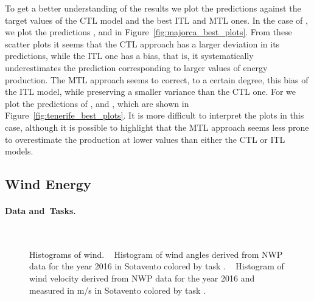 %
To get a better understanding of the results we plot the predictions against the target values of the CTL model and the best ITL and MTL ones.
%
In the case of , we plot the predictions ,  and  in Figure~\ref{fig:majorca_best_plots}.
From these scatter plots it seems that the CTL approach has a larger deviation in its predictions, while the ITL one has a bias, that is, it systematically underestimates the prediction corresponding to larger values of energy production.
The MTL approach seems to correct, to a certain degree, this bias of the ITL model, while preserving a smaller variance than the CTL one.
%
For  we plot the predictions of ,  and , which are shown in Figure~\ref{fig:tenerife_best_plots}.
It is more difficult to interpret the plots in this case, although it is possible to highlight that the MTL approach seems less prone to overestimate the production at lower values than either the CTL or ITL models.








\subsection{Wind Energy}

\paragraph*{Data and~Tasks.\\}

\begin{figure}[H]
    \centering%
    \quad%
    \\
 \caption{\label{fig:wind_task_def} Histograms of wind. ~\protect{} {Histogram} %
  of wind angles derived from NWP data for the year 2016 in Sotavento colored by task . ~\protect{}  Histogram of wind velocity derived from NWP data for the year 2016 and measured in m/s in Sotavento colored by {task} .}
\end{figure}

